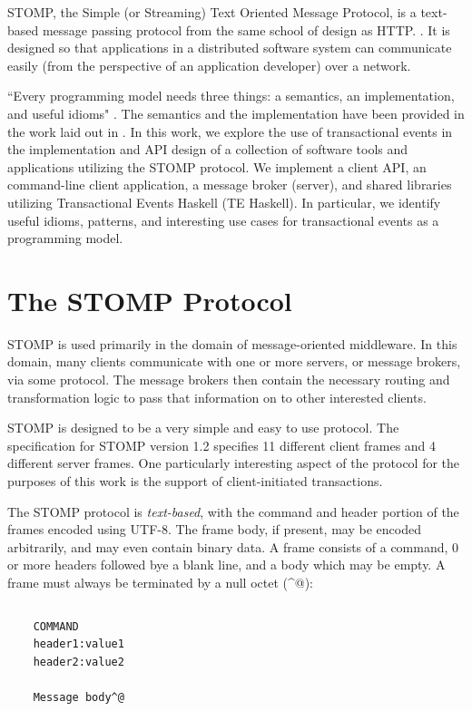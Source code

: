 \documentclass[conference, letterpaper]{IEEEtran}
\begin{document}
STOMP, the Simple (or Streaming) Text Oriented Message Protocol, is a text-based message passing protocol from the same school of design as HTTP.
\cite{stomp:spec}. It is designed so that applications in a distributed software system can communicate easily (from the 
perspective of an application developer) over a network.

``Every programming model needs three things: a semantics, an implementation, and useful idioms" 
\cite{te:idioms}. The semantics and the implementation have been provided in the work laid out in \cite{te:original}.
In this work, we explore the use of transactional events in the implementation and API design of a
collection of software tools and applications utilizing the STOMP protocol. We implement a client 
API, an command-line client application, a message broker (server), and shared libraries utilizing 
Transactional Events Haskell (TE Haskell). In particular, we identify useful idioms, patterns,
and interesting use cases for transactional events as a programming model.

\section{The STOMP Protocol}

STOMP is used primarily in the domain of message-oriented middleware. In this domain, many clients
communicate with one or more servers, or message brokers, via some protocol. The message brokers then contain the necessary routing and transformation logic to pass that information on to other interested clients.

STOMP is designed to be a very simple and easy to use protocol. The specification for STOMP version 1.2 specifies 11 different client frames and 4 different server frames. One particularly interesting aspect of the protocol for the purposes of this work is the support of client-initiated transactions.

The STOMP protocol is \textit{text-based}, with the command and header portion of the frames encoded using UTF-8. The frame body, if present, may be encoded arbitrarily, and may even contain binary data. A frame consists of a command, 0 or more headers followed bye a blank line, and a body which may be empty. A frame must always be terminated by a null octet (\^{}@):

\begin{verbatim}
\end{verbatim}
\begin{verbatim}
    COMMAND
    header1:value1
    header2:value2

    Message body^@
\end{verbatim}
\begin{verbatim}
\end{verbatim}
\end{document}
